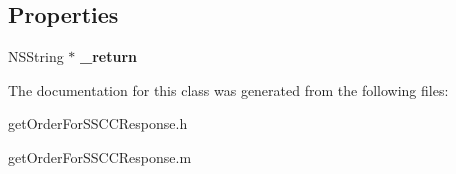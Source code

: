 \subsection*{Properties}
\begin{DoxyCompactItemize}
\item 
\hypertarget{interfaceget_order_for_s_s_c_c_response_a1d8560a99a59081f8595d6b7802edb69}{}N\+S\+String $\ast$ {\bfseries \+\_\+return}\label{interfaceget_order_for_s_s_c_c_response_a1d8560a99a59081f8595d6b7802edb69}

\end{DoxyCompactItemize}


The documentation for this class was generated from the following files\+:\begin{DoxyCompactItemize}
\item 
get\+Order\+For\+S\+S\+C\+C\+Response.\+h\item 
get\+Order\+For\+S\+S\+C\+C\+Response.\+m\end{DoxyCompactItemize}
